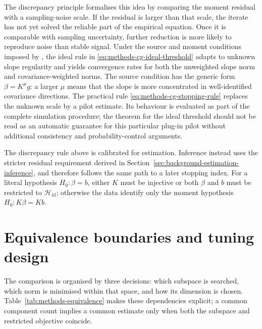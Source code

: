 The discrepancy principle formalises this idea by comparing the moment
residual with a sampling-noise scale.  If the residual is larger than that
scale, the iterate has not yet solved the reliable part of the empirical
equation.  Once it is comparable with sampling uncertainty, further
reduction is more likely to reproduce noise than stable signal.  Under the
source and moment conditions imposed by
\textcite{babii_carrasco_tsafack_2026}, the ideal rule in
\eqref{eq:methods-cg-ideal-threshold} adapts to unknown slope regularity and
yields convergence rates for both the unweighted slope norm and
covariance-weighted norms.  The source condition has the generic form
$\beta=K^\mu g$: a larger $\mu$ means that the slope is more concentrated in
well-identified covariance directions.  The practical rule
\eqref{eq:methods-cg-stopping-rule} replaces the unknown scale by a pilot
estimate.  Its behaviour is evaluated as part of the complete simulation
procedure; the theorem for the ideal threshold should not be read as an
automatic guarantee for this particular plug-in pilot without additional
consistency and probability-control arguments.

The discrepancy rule above is calibrated for estimation.  Inference instead
uses the stricter residual requirement derived in
Section~\ref{sec:background-estimation-inference}, and therefore follows the
same path to a later stopping index.  For a literal hypothesis
$H_0:\beta=b$, either $K$ must be injective or both $\beta$ and $b$ must be
restricted to $\mathcal H_{\mathrm{id}}$; otherwise the data identify only
the moment hypothesis $H_0:K\beta=Kb$.

\section{Equivalence boundaries and tuning design}
\label{sec:methods-comparison-framework}

The comparison is organised by three decisions: which subspace is searched,
which norm is minimised within that space, and how its dimension is chosen.
Table~\ref{tab:methods-equivalence} makes these dependencies explicit; a
common component count implies a common estimate only when both the subspace
and restricted objective coincide.

